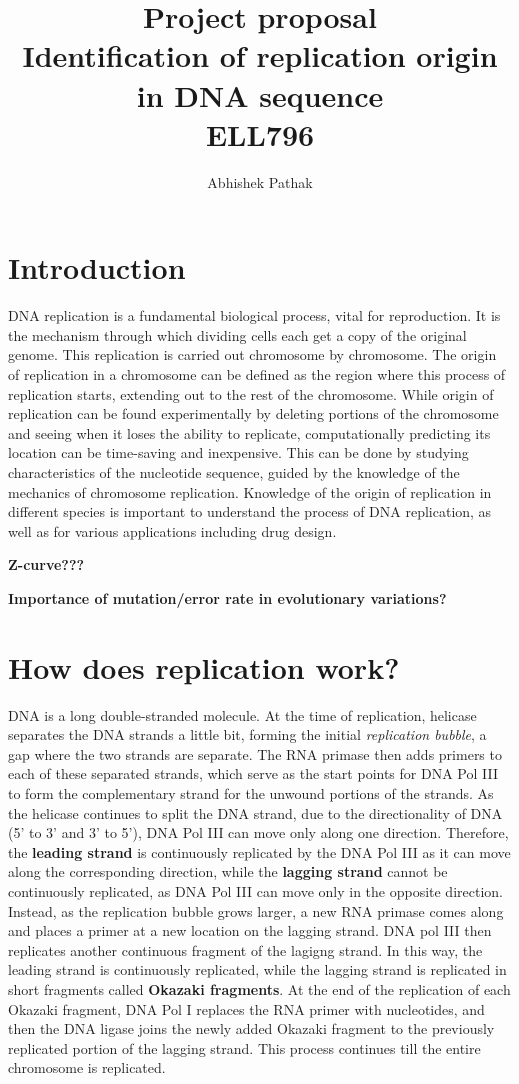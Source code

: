 \documentclass[10pt]{article}
\title{\textbf{Project proposal\\Identification of replication origin in DNA sequence\\ELL796}}
\author{Abhishek Pathak}
\date{}
\begin{document}
\maketitle

\section{Introduction}

DNA replication is a fundamental biological process, vital for reproduction. It is the mechanism through which dividing cells each get a copy of the original genome. This replication is carried out chromosome by chromosome. The origin of replication in a chromosome can be defined as the region where this process of replication starts, extending out to the rest of the chromosome. While origin of replication can be found experimentally by deleting portions of the chromosome and seeing when it loses the ability to replicate, computationally predicting its location can be time-saving and inexpensive. This can be done by studying characteristics of the nucleotide sequence, guided by the knowledge of the mechanics of chromosome replication. Knowledge of the origin of replication in different species is important to understand the process of DNA replication, as well as for various applications including drug design.

\textbf{Z-curve???}

\textbf{Importance of mutation/error rate in evolutionary variations?}

\section{How does replication work?}

DNA is a long double-stranded molecule. At the time of replication, helicase separates the DNA strands a little bit, forming the initial \textit{replication bubble}, a gap where the two strands are separate. The RNA primase then adds primers to each of these separated strands, which serve as the start points for DNA Pol III to form the complementary strand for the unwound portions of the strands. As the helicase continues to split the DNA strand, due to the directionality of DNA (5' to 3' and 3' to 5'), DNA Pol III can move only along one direction. Therefore, the \textbf{leading strand} is continuously replicated by the DNA Pol III as it can move along the corresponding direction, while the \textbf{lagging strand} cannot be continuously replicated, as DNA Pol III can move only in the opposite direction. Instead, as the replication bubble grows larger, a new RNA primase comes along and places a primer at a new location on the lagging strand. DNA pol III then replicates another continuous fragment of the lagigng strand. In this way, the leading strand is continuously replicated, while the lagging strand is replicated in short fragments called \textbf{Okazaki fragments}. At the end of the replication of each Okazaki fragment, DNA Pol I replaces the RNA primer with nucleotides, and then the DNA ligase joins the newly added Okazaki fragment to the previously replicated portion of the lagging strand. This process continues till the entire chromosome is replicated.
\end{document}

